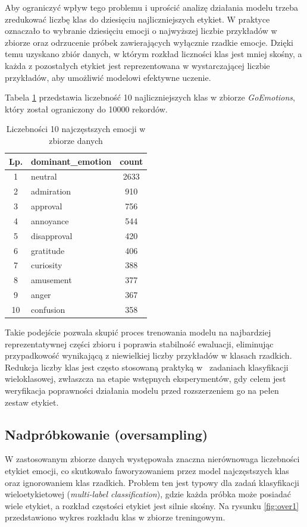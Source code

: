 \documentclass[wmii, inf, mgr]{uwmthesis}
\begin{document}
Aby ograniczyć wpływ tego problemu i uprościć analizę działania modelu trzeba zredukować liczbę klas do dziesięciu najliczniejszych etykiet. W praktyce oznaczało to wybranie dziesięciu emocji o najwyższej liczbie przykładów w zbiorze oraz odrzucenie próbek zawierających wyłącznie rzadkie emocje. Dzięki temu uzyskano zbiór danych, w którym rozkład liczności klas jest mniej skośny, a każda z pozostałych etykiet jest reprezentowana w wystarczającej liczbie przykładów, aby umożliwić modelowi efektywne uczenie.

Tabela \ref{tab:emocje_top10} przedstawia liczebność 10 najliczniejszych klas w zbiorze \textit{GoEmotions}, który został ograniczony do 10000 rekordów.

\begin{table}[H]
	\centering
	\renewcommand{\arraystretch}{1.2}
	\begin{tabular}{|c|l|c|}
		\hline
		\textbf{Lp.} & \textbf{dominant\_emotion} & \textbf{count} \\ \hline
		1 & neutral       & 2633 \\ \hline
		2 & admiration    & 910  \\ \hline
		3 & approval      & 756  \\ \hline
		4 & annoyance     & 544  \\ \hline
		5 & disapproval   & 420  \\ \hline
		6 & gratitude     & 406  \\ \hline
		7 & curiosity     & 388  \\ \hline
		8 & amusement     & 377  \\ \hline
		9 & anger         & 367  \\ \hline
		10 & confusion     & 358  \\ \hline
	\end{tabular}
	\caption{Liczebności 10 najczęstszych emocji w zbiorze danych}
	\label{tab:emocje_top10}
\end{table}

Takie podejście pozwala skupić proces trenowania modelu na najbardziej reprezentatywnej części zbioru i poprawia stabilność ewaluacji, eliminując przypadkowość wynikającą z niewielkiej liczby przykładów w klasach rzadkich. Redukcja liczby klas jest często stosowaną praktyką w~ zadaniach klasyfikacji wieloklasowej, zwłaszcza na etapie wstępnych eksperymentów, gdy celem jest weryfikacja poprawności działania modelu przed rozszerzeniem go na pełen zestaw etykiet. 


\subsection{Nadpróbkowanie (oversampling)}
W zastosowanym zbiorze danych występowała znaczna nierównowaga liczebności etykiet emocji, co skutkowało faworyzowaniem przez model najczęstszych klas oraz ignorowaniem klas rzadkich. Problem ten jest typowy dla zadań klasyfikacji wieloetykietowej (\textit{multi-label classification}), gdzie każda próbka może posiadać wiele etykiet, a rozkład częstości etykiet jest silnie skośny. Na rysunku \ref{fig:over1} przedstawiono wykres rozkładu klas w zbiorze treningowym.
 
\end{document}
